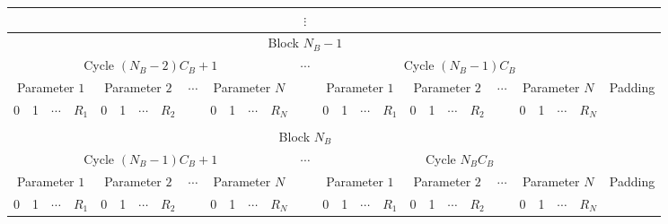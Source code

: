 \documentclass{standalone}
\begin{document}
\begin{tabular}{@{}|c|c|c|c|c|c|c|c|c|c|c|c|c|c|c|c|c|c|c|c|c|c|c|c|c|c|c|c|@{}}
		\multicolumn{27}{c}{\(\vdots\)} \\
		\hline
			\multicolumn{27}{|c}{Block \(N_B-1\)} & \\
		\hline
			\multicolumn{13}{|c|}{Cycle \((N_B - 2) C_B + 1\)} &
			\multirow{3}{*}{\(\cdots\)} &
			\multicolumn{13}{|c|}{Cycle \((N_B - 1) C_B\)} & \\
		\cline{1-13}
		\cline{15-27}
			\multicolumn{4}{|c|}{Parameter \(1\)} &
			\multicolumn{4}{|c|}{Parameter \(2\)} &
			\multirow{2}{*}{\(\cdots\)} &
			\multicolumn{4}{|c|}{Parameter \(N\)} &
			&
			\multicolumn{4}{|c|}{Parameter \(1\)} &
			\multicolumn{4}{|c|}{Parameter \(2\)} &
			\multirow{2}{*}{\(\cdots\)} &
			\multicolumn{4}{|c|}{Parameter \(N\)} &
			\multirow{2}{*}{Padding} \\
		\cline{1-8}
		\cline{10-13}
		\cline{15-22}
		\cline{24-27}
			0 & 1 & \(\cdots\) & \(R_1\) &
			0 & 1 & \(\cdots\) & \(R_2\) & &
			0 & 1 & \(\cdots\) & \(R_N\) &
			&
			0 & 1 & \(\cdots\) & \(R_1\) &
			0 & 1 & \(\cdots\) & \(R_2\) & &
			0 & 1 & \(\cdots\) & \(R_N\) & \\
		\hline
		\multicolumn{8}{c}{\raisebox{1em}{}} \\
		\hline
			\multicolumn{27}{|c}{Block \(N_B\)} & \\
		\hline
			\multicolumn{13}{|c|}{Cycle \((N_B - 1) C_B + 1\)} &
			\multirow{3}{*}{\(\cdots\)} &
			\multicolumn{13}{|c|}{Cycle \(N_B C_B\)} & \\
		\cline{1-13}
		\cline{15-27}
			\multicolumn{4}{|c|}{Parameter \(1\)} &
			\multicolumn{4}{|c|}{Parameter \(2\)} &
			\multirow{2}{*}{\(\cdots\)} &
			\multicolumn{4}{|c|}{Parameter \(N\)} &
			&
			\multicolumn{4}{|c|}{Parameter \(1\)} &
			\multicolumn{4}{|c|}{Parameter \(2\)} &
			\multirow{2}{*}{\(\cdots\)} &
			\multicolumn{4}{|c|}{Parameter \(N\)} &
			\multirow{2}{*}{Padding} \\
		\cline{1-8}
		\cline{10-13}
		\cline{15-22}
		\cline{24-27}
			0 & 1 & \(\cdots\) & \(R_1\) &
			0 & 1 & \(\cdots\) & \(R_2\) & &
			0 & 1 & \(\cdots\) & \(R_N\) &
			&
			0 & 1 & \(\cdots\) & \(R_1\) &
			0 & 1 & \(\cdots\) & \(R_2\) & &
			0 & 1 & \(\cdots\) & \(R_N\) & \\
		\hline
	\end{tabular}
\end{document}
